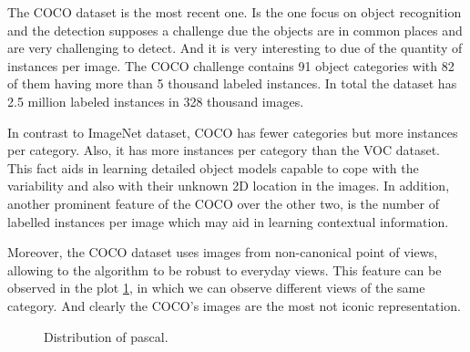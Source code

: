 The COCO dataset is the most recent one. Is the one focus on object recognition and the detection supposes a challenge due the objects are in common places and are very challenging to detect. And it is very interesting to due of the quantity of instances per image. The COCO challenge contains 91 object categories with 82 of them having more than 5 thousand labeled instances. In total the dataset has 2.5 million labeled instances in 328 thousand images. 

In contrast to ImageNet dataset, COCO has fewer categories but more instances per category. Also, it has more instances per category than the VOC dataset. This fact aids in learning detailed object models capable to cope with the variability and also with their unknown 2D location in the images. In addition, another prominent feature of the COCO over the other two, is the number of labelled instances per image which may aid in learning contextual information.


Moreover, the COCO dataset uses images from non-canonical point of views, allowing to the algorithm to be robust to everyday views. This feature can be observed in the plot \ref{iconic}, in which we can observe different views of the same category. And clearly the COCO's images are the most not iconic representation.

\begin{figure}[H]
		
\centering
{}
\caption{Distribution of pascal.} \label{iconic}

\end{figure}


